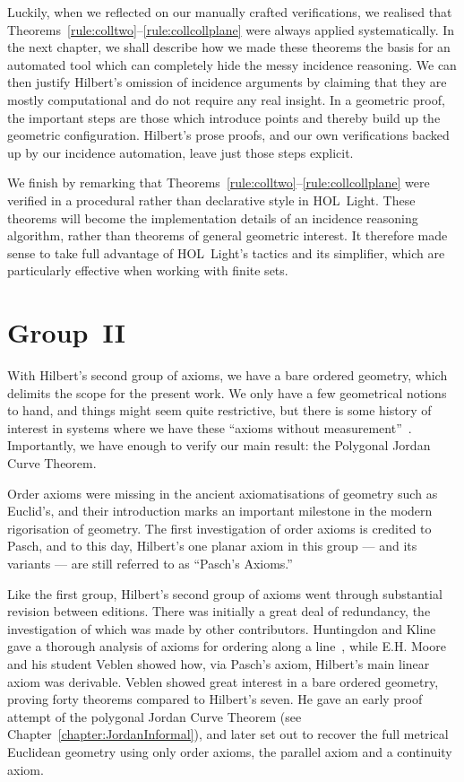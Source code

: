 Luckily, when we reflected on our manually crafted verifications, we realised that Theorems~\ref{rule:colltwo}--\ref{rule:collcollplane} were always applied systematically. In the next chapter, we shall describe how we made these theorems the basis for an automated tool which can completely hide the messy incidence reasoning. We can then justify Hilbert's omission of incidence arguments by claiming that they are mostly computational and do not require any real insight. In a geometric proof, the important steps are those which introduce points and thereby build up the geometric configuration. Hilbert's prose proofs, and our own verifications backed up by our incidence automation, leave just those steps explicit.

We finish by remarking that Theorems~\ref{rule:colltwo}--\ref{rule:collcollplane} were verified in a procedural rather than declarative style in HOL~Light. These theorems will become the implementation details of an incidence reasoning algorithm, rather than theorems of general geometric interest. It therefore made sense to take full advantage of HOL~Light's tactics and its simplifier, which are particularly effective when working with finite sets.

\section{Group~II}
With Hilbert's second group of axioms, we have a bare ordered geometry, which delimits the scope for the present work. We only have a few geometrical notions to hand, and things might seem quite restrictive, but there is some history of interest in systems where we have these ``axioms without measurement''~\cite{AxiomaticsOrderedGeometry}. Importantly, we have enough to verify our main result: the Polygonal Jordan Curve Theorem.

Order axioms were missing in the ancient axiomatisations of geometry such as Euclid's, and their introduction marks an important milestone in the modern rigorisation of geometry. The first investigation of order axioms is credited to Pasch, and to this day, Hilbert's one planar axiom in this group --- and its variants --- are still referred to as ``Pasch's Axioms.''

Like the first group, Hilbert's second group of axioms went through substantial revision between editions. There was initially a great deal of redundancy, the investigation of which was made by other contributors. Huntingdon and Kline gave a thorough analysis of axioms for ordering along a line~\cite{AnalysisBetweenness}, while E.H. Moore and his student Veblen showed how, via Pasch's axiom, Hilbert's main linear axiom was derivable. Veblen showed great interest in a bare ordered geometry, proving forty theorems compared to Hilbert's seven. He gave an early proof attempt of the polygonal Jordan Curve Theorem (see Chapter~\ref{chapter:JordanInformal}), and later set out to recover the full metrical Euclidean geometry using only order axioms, the parallel axiom and a continuity axiom.

